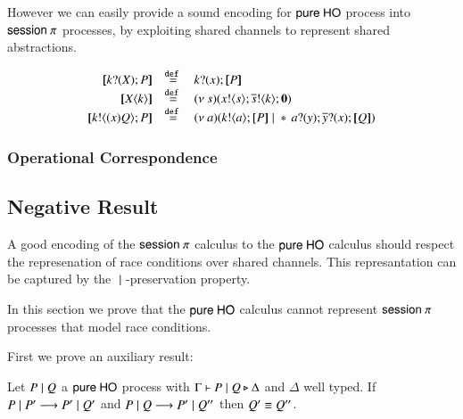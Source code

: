 However we can easily provide a sound encoding for $\mathsf{pure\ HO}$
process into $\mathsf{session\ }\pi$ processes, by exploiting shared channels
to represent shared abstractions.

\[
\begin{array}{rcl}
	\map{\binp{k}{\X} P} &\defeq& \binp{k}{x} \map{P}\\
	\map{\appl{\X}{k}} &\defeq& \newsp{s}{\bout{x}{s} \bout{\dual{s}}{k} \inact}\\
	\map{\bout{k}{\abs{x} Q} P} &\defeq& \newsp{a}{\bout{k}{a} \map{P} \Par \repl{} \binp{a}{y} \binp{\dual{y}}{x} \map{Q}}
\end{array}
\]

\subsubsection{Operational Correspondence}


\subsection{Negative Result}

A good encoding of the $\mathsf{session\ }\pi$ calculus to the $\mathsf{pure\ HO}$ calculus
should respect the represenation of race conditions over shared
channels. This represantation can be captured by the $\;|\;$-preservation
property.

In this section we prove that the $\mathsf{pure\ HO}$ calculus cannot represent
$\mathsf{session\ }\pi$ processes that model race conditions.

First we prove an auxiliary result:

\begin{lemma}
	\label{lem:unique_red}
	Let $P \;|\; Q$ a $\mathsf{pure\ HO}$ process with
	$\Gamma \vdash P \;|\; Q \triangleright \Delta$ and
	$\Delta$ well typed.
	If $P \;|\; P' \longrightarrow P' \;|\; Q'$ and
	$P \;|\; Q \longrightarrow P' \;|\; Q''$ then
	$Q' \equiv Q''$.
\end{lemma}

